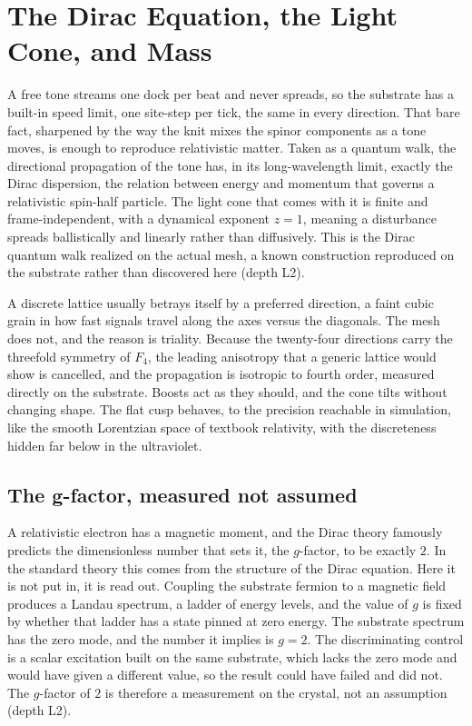 \section{The Dirac Equation, the Light Cone, and Mass}

A free tone streams one dock per beat and never spreads, so the substrate has a built-in speed limit, one site-step per tick, the same in every direction. That bare fact, sharpened by the way the knit mixes the spinor components as a tone moves, is enough to reproduce relativistic matter. Taken as a quantum walk, the directional propagation of the tone has, in its long-wavelength limit, exactly the Dirac dispersion, the relation between energy and momentum that governs a relativistic spin-half particle. The light cone that comes with it is finite and frame-independent, with a dynamical exponent $z = 1$, meaning a disturbance spreads ballistically and linearly rather than diffusively. This is the Dirac quantum walk realized on the actual mesh, a known construction reproduced on the substrate rather than discovered here (depth L2).

A discrete lattice usually betrays itself by a preferred direction, a faint cubic grain in how fast signals travel along the axes versus the diagonals. The mesh does not, and the reason is triality. Because the twenty-four directions carry the threefold symmetry of $F_4$, the leading anisotropy that a generic lattice would show is cancelled, and the propagation is isotropic to fourth order, measured directly on the substrate. Boosts act as they should, and the cone tilts without changing shape. The flat cusp behaves, to the precision reachable in simulation, like the smooth Lorentzian space of textbook relativity, with the discreteness hidden far below in the ultraviolet.

\subsection{The g-factor, measured not assumed}

A relativistic electron has a magnetic moment, and the Dirac theory famously predicts the dimensionless number that sets it, the $g$-factor, to be exactly $2$. In the standard theory this comes from the structure of the Dirac equation. Here it is not put in, it is read out. Coupling the substrate fermion to a magnetic field produces a Landau spectrum, a ladder of energy levels, and the value of $g$ is fixed by whether that ladder has a state pinned at zero energy. The substrate spectrum has the zero mode, and the number it implies is $g = 2$. The discriminating control is a scalar excitation built on the same substrate, which lacks the zero mode and would have given a different value, so the result could have failed and did not. The $g$-factor of $2$ is therefore a measurement on the crystal, not an assumption (depth L2).

